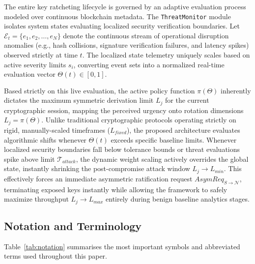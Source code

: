 \documentclass[journal, 10pt, twocolumn]{IEEEtran}
\begin{document}
The entire key ratcheting lifecycle is governed by an adaptive evaluation process modeled over continuous blockchain metadata. The \texttt{ThreatMonitor} module isolates system states evaluating localized security verification boundaries. Let $\mathcal{E}_t = \{e_1, e_2, \dots, e_N\}$ denote the continuous stream of operational disruption anomalies (e.g., hash collisions, signature verification failures, and latency spikes) observed strictly at time $t$. The localized state telemetry uniquely scales based on active severity limits $s_i$, converting event sets into a normalized real-time evaluation vector $\Theta(t) \in [0, 1]$.

Based strictly on this live evaluation, the active policy function $\pi(\Theta)$ inherently dictates the maximum symmetric derivation limit $L_j$ for the current cryptographic session, mapping the perceived urgency onto rotation dimensions $L_j = \pi(\Theta)$. Unlike traditional cryptographic protocols operating strictly on rigid, manually-scaled timeframes ($L_{fixed}$), the proposed architecture evaluates algorithmic shifts whenever $\Theta(t)$ exceeds specific baseline limits. Whenever localized security boundaries fall below tolerance bounds or threat evaluations spike above limit $\mathcal{T}_{attack}$, the dynamic weight scaling actively overrides the global state, instantly shrinking the post-compromise attack window $L_j \to L_{min}$. This effectively forces an immediate asymmetric ratification request $AsymReq_{S \to \mathcal{N}}$, terminating exposed keys instantly while allowing the framework to safely maximize throughput $L_j \to L_{max}$ entirely during benign baseline analytics stages.


\subsection{Notation and Terminology}
Table~\ref{tab:notation} summarises the most important symbols and abbreviated terms used throughout this paper.
\end{document}

